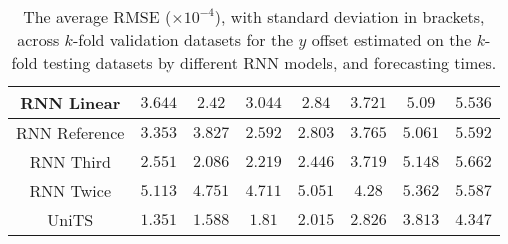 \begin{table}[!ht]
{\begin{tabular}{|c|c|c|c|c|c|c|c|}
			RNN Linear & $3.644$ & $2.42$ & $3.044$ & $2.84$ & $3.721$ & $5.09$ & $5.536$ \\ \hline
			RNN Reference & $3.353$ & $3.827$ & $2.592$ & $2.803$ & $3.765$ & $5.061$ & $5.592$ \\ \hline
			RNN Third & $2.551$ & $2.086$ & $2.219$ & $2.446$ & $3.719$ & $5.148$ & $5.662$ \\ \hline
			RNN Twice & $5.113$ & $4.751$ & $4.711$ & $5.051$ & $4.28$ & $5.362$ & $5.587$ \\ \hline
			UniTS & $1.351$ & $1.588$ & $1.81$ & $2.015$ & $\mathbf{2.826}$ & $\mathbf{3.813}$ & $\mathbf{4.347}$ \\ \hline
		\end{tabular}
	}
	\caption{The average RMSE ($\times 10^{-4}$), with standard deviation in brackets, across $k$-fold validation datasets for the $y$ offset estimated on the $k$-fold testing datasets by different RNN models, and forecasting times.}
	\label{tab:all_latitude_no_abs_RMSE}
\end{table}